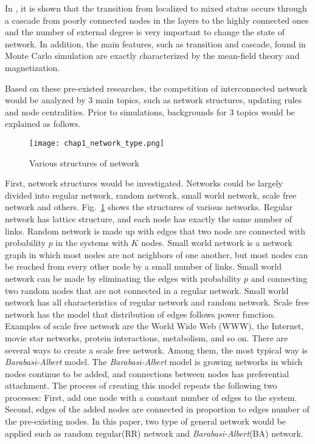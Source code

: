 In \parencite{gomez2015}, it is shown that the transition from localized to mixed status occurs through a cascade from poorly connected nodes in the layers to the highly connected ones and the number of external degree is very important to change the state of network. In addition, the main features, such as transition and cascade, found in Monte Carlo simulation are exactly characterized by the mean-field theory and magnetization\parencite{alvarez2016, diep2017, amato2017, gomez2015}. 

Based on these pre-existed researches, the competition of interconnected network would be analyzed by 3 main topics, such as network structures, updating rules and node centralities. Prior to simulations, backgrounds for 3 topics would be explained as follows. 
\begin{figure}[!htb]
	\centering
	\texttt{[image: chap1\_network\_type.png]}
	\caption{Various structures of network}
	\label{chap1_network_type}
\end{figure}
First, network structures would be investigated. Networks could be largely divided into regular network, random network\parencite{erdos1960}, small world network\parencite{watts1998}, scale free network\parencite{barabasi1999} and others. Fig.~\ref{chap1_network_type} shows the structures of various networks. Regular network has lattice structure, and  each node has exactly the same number of links. Random network is made up with edges that two node are connected with probability $p$ in the systems with $K$ nodes. Small world network is a network graph in which most nodes are not neighbors of one another, but most nodes can be reached from every other node by a small number of links. Small world network can be made by eliminating the edges with probability $p$ and connecting two random nodes that are not connected in a regular network. Small world network has all characteristics of regular network and random network. Scale free network has the model that distribution of edges follows power function. Examples of scale free network are the World Wide Web (WWW), the Internet, movie star networks, protein interactions, metabolism, and so on. There are several ways to create a scale free network. Among them, the most typical way is \textit{Barabasi-Albert} model. The \textit{Barabasi-Albert} model is growing networks in which nodes continue to be added, and connections between nodes has preferential attachment. The process of creating this model repeats the following two processes: First, add one node with a constant number of edges to the system. Second, edges of the added nodes are connected in proportion to edges number of the pre-existing nodes. In this paper, two type of general network would be applied such as random regular(RR) network and \textit{Barabasi-Albert}(BA) network. 

